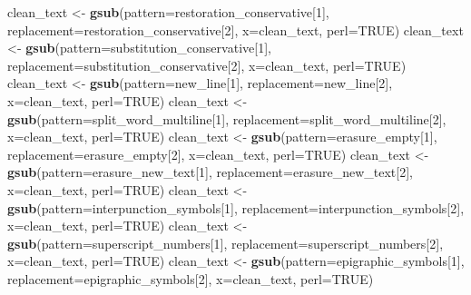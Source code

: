\documentclass[]{article}
\newenvironment{Shaded}{\begin{snugshade}}{\end{snugshade}}
\newcommand{\DataTypeTok}[1]{\textcolor[rgb]{0.13,0.29,0.53}{#1}}
\newcommand{\DecValTok}[1]{\textcolor[rgb]{0.00,0.00,0.81}{#1}}
\newcommand{\KeywordTok}[1]{\textcolor[rgb]{0.13,0.29,0.53}{\textbf{#1}}}
\newcommand{\NormalTok}[1]{#1}
\newcommand{\OtherTok}[1]{\textcolor[rgb]{0.56,0.35,0.01}{#1}}
\newcommand{\StringTok}[1]{\textcolor[rgb]{0.31,0.60,0.02}{#1}}
\begin{document}
\begin{Shaded}
\begin{Highlighting}[]
\NormalTok{  clean_text <-}\StringTok{ }\KeywordTok{gsub}\NormalTok{(}\DataTypeTok{pattern=}\NormalTok{restoration_conservative[}\DecValTok{1}\NormalTok{], }\DataTypeTok{replacement=}\NormalTok{restoration_conservative[}\DecValTok{2}\NormalTok{], }\DataTypeTok{x=}\NormalTok{clean_text, }\DataTypeTok{perl=}\OtherTok{TRUE}\NormalTok{)}
\NormalTok{  clean_text <-}\StringTok{ }\KeywordTok{gsub}\NormalTok{(}\DataTypeTok{pattern=}\NormalTok{substitution_conservative[}\DecValTok{1}\NormalTok{], }\DataTypeTok{replacement=}\NormalTok{substitution_conservative[}\DecValTok{2}\NormalTok{], }\DataTypeTok{x=}\NormalTok{clean_text, }\DataTypeTok{perl=}\OtherTok{TRUE}\NormalTok{)}
\NormalTok{  clean_text <-}\StringTok{ }\KeywordTok{gsub}\NormalTok{(}\DataTypeTok{pattern=}\NormalTok{new_line[}\DecValTok{1}\NormalTok{], }\DataTypeTok{replacement=}\NormalTok{new_line[}\DecValTok{2}\NormalTok{], }\DataTypeTok{x=}\NormalTok{clean_text, }\DataTypeTok{perl=}\OtherTok{TRUE}\NormalTok{)}
\NormalTok{  clean_text <-}\StringTok{ }\KeywordTok{gsub}\NormalTok{(}\DataTypeTok{pattern=}\NormalTok{split_word_multiline[}\DecValTok{1}\NormalTok{], }\DataTypeTok{replacement=}\NormalTok{split_word_multiline[}\DecValTok{2}\NormalTok{], }\DataTypeTok{x=}\NormalTok{clean_text, }\DataTypeTok{perl=}\OtherTok{TRUE}\NormalTok{)}
\NormalTok{  clean_text <-}\StringTok{ }\KeywordTok{gsub}\NormalTok{(}\DataTypeTok{pattern=}\NormalTok{erasure_empty[}\DecValTok{1}\NormalTok{], }\DataTypeTok{replacement=}\NormalTok{erasure_empty[}\DecValTok{2}\NormalTok{], }\DataTypeTok{x=}\NormalTok{clean_text, }\DataTypeTok{perl=}\OtherTok{TRUE}\NormalTok{)}
\NormalTok{  clean_text <-}\StringTok{ }\KeywordTok{gsub}\NormalTok{(}\DataTypeTok{pattern=}\NormalTok{erasure_new_text[}\DecValTok{1}\NormalTok{], }\DataTypeTok{replacement=}\NormalTok{erasure_new_text[}\DecValTok{2}\NormalTok{], }\DataTypeTok{x=}\NormalTok{clean_text, }\DataTypeTok{perl=}\OtherTok{TRUE}\NormalTok{)}
\NormalTok{  clean_text <-}\StringTok{ }\KeywordTok{gsub}\NormalTok{(}\DataTypeTok{pattern=}\NormalTok{interpunction_symbols[}\DecValTok{1}\NormalTok{], }\DataTypeTok{replacement=}\NormalTok{interpunction_symbols[}\DecValTok{2}\NormalTok{], }\DataTypeTok{x=}\NormalTok{clean_text, }\DataTypeTok{perl=}\OtherTok{TRUE}\NormalTok{)}
\NormalTok{  clean_text <-}\StringTok{ }\KeywordTok{gsub}\NormalTok{(}\DataTypeTok{pattern=}\NormalTok{superscript_numbers[}\DecValTok{1}\NormalTok{], }\DataTypeTok{replacement=}\NormalTok{superscript_numbers[}\DecValTok{2}\NormalTok{], }\DataTypeTok{x=}\NormalTok{clean_text, }\DataTypeTok{perl=}\OtherTok{TRUE}\NormalTok{)}
\NormalTok{  clean_text <-}\StringTok{ }\KeywordTok{gsub}\NormalTok{(}\DataTypeTok{pattern=}\NormalTok{epigraphic_symbols[}\DecValTok{1}\NormalTok{], }\DataTypeTok{replacement=}\NormalTok{epigraphic_symbols[}\DecValTok{2}\NormalTok{], }\DataTypeTok{x=}\NormalTok{clean_text, }\DataTypeTok{perl=}\OtherTok{TRUE}\NormalTok{)}

\end{Highlighting}
\end{Shaded}
\end{document}
